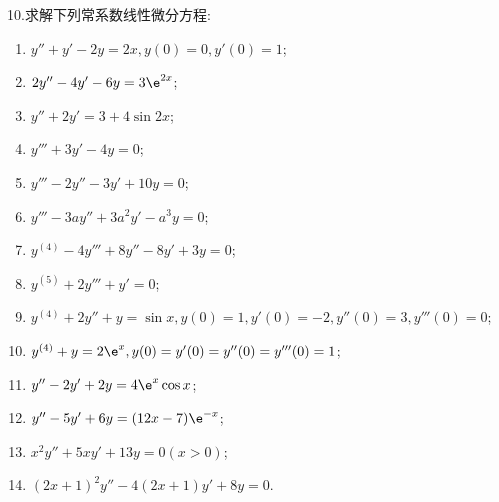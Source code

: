 10.求解下列常系数线性微分方程:
\begin{enumerate}[(1)]
\item $y''+y'-2y=2x,y(0)=0,y'(0)=1$;
\item $2y''-4y'-6y=3\e^{2x}$;
\item $y''+2y'=3+4\sin 2x$;
\item $y'''+3y'-4y=0$;
\item $y'''-2y''-3y'+10y=0$;
\item $y'''-3ay''+3a^2y'-a^3y=0$;
\item $y^{(4)}-4y'''+8y''-8y'+3y=0$;
\item $y^{(5)}+2y'''+y'=0$;
\item $y^{(4)}+2y''+y=\sin x,y(0)=1,y'(0)=-2,y''(0)=3,y'''(0)=0$;
\item $y^{(4)}+y=2\e^x,y(0)=y'(0)=y''(0)=y'''(0)=1$;
\item $y''-2y'+2y=4\e^x\cos x$;
\item $y''-5y'+6y=(12x-7)\e^{-x}$;
\item $x^2y''+5xy'+13y=0(x>0)$;
\item $(2x+1)^2y''-4(2x+1)y'+8y=0$.
\end{enumerate}

